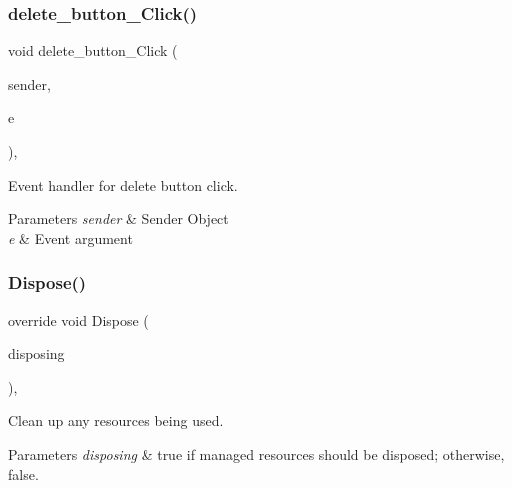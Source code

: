 \subsubsection{\texorpdfstring{delete\+\_\+button\+\_\+\+Click()}{delete\_button\_Click()}}
{\footnotesize\ttfamily void delete\+\_\+button\+\_\+\+Click (\begin{DoxyParamCaption}\item[{object}]{sender,  }\item[{Event\+Args}]{e }\end{DoxyParamCaption})\hspace{0.3cm}{\ttfamily [inline]}, {\ttfamily [private]}}



Event handler for delete button click. 


\begin{DoxyParams}{Parameters}
{\em sender} & Sender Object\\
\hline
{\em e} & Event argument\\
\hline
\end{DoxyParams}
\mbox{\label{classWildlifeTrackingApp_1_1GPSDevice_a849c3c7f8d08104f0cdb46bee9fe6389}} 
\subsubsection{\texorpdfstring{Dispose()}{Dispose()}}
{\footnotesize\ttfamily override void Dispose (\begin{DoxyParamCaption}\item[{bool}]{disposing }\end{DoxyParamCaption})\hspace{0.3cm}{\ttfamily [inline]}, {\ttfamily [protected]}}



Clean up any resources being used. 


\begin{DoxyParams}{Parameters}
{\em disposing} & true if managed resources should be disposed; otherwise, false.\\
\hline
\end{DoxyParams}
\mbox{\label{classWildlifeTrackingApp_1_1GPSDevice_a72673ff63cce544357c7d37b7277d2a9}} 
